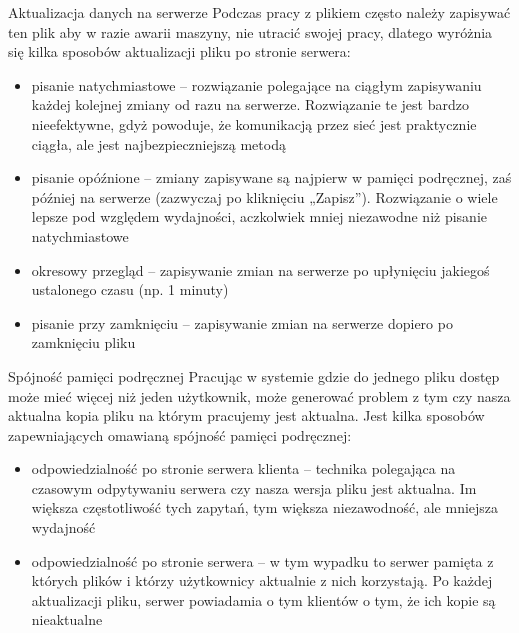 Aktualizacja danych na serwerze
Podczas pracy z plikiem często należy zapisywać ten plik aby w razie awarii maszyny, nie utracić swojej pracy, dlatego wyróżnia się kilka sposobów aktualizacji pliku po stronie serwera:
\begin{itemize}
\item pisanie natychmiastowe – rozwiązanie polegające na ciągłym zapisywaniu każdej kolejnej zmiany od razu na serwerze. Rozwiązanie te jest bardzo nieefektywne, gdyż powoduje, że komunikacją przez sieć jest praktycznie ciągła, ale jest najbezpieczniejszą metodą
\item pisanie opóźnione – zmiany zapisywane są najpierw w pamięci podręcznej, zaś później na serwerze (zazwyczaj po kliknięciu „Zapisz”). Rozwiązanie o wiele lepsze pod względem wydajności, aczkolwiek mniej niezawodne niż pisanie natychmiastowe
\item okresowy przegląd – zapisywanie zmian na serwerze po upłynięciu jakiegoś ustalonego czasu (np. 1 minuty)
\item pisanie przy zamknięciu – zapisywanie zmian na serwerze dopiero po zamknięciu pliku
 \end{itemize}
Spójność pamięci podręcznej
Pracując w systemie gdzie do jednego pliku dostęp może mieć więcej niż jeden użytkownik, może generować problem z tym czy nasza aktualna kopia pliku na którym pracujemy jest aktualna. Jest kilka sposobów zapewniających omawianą spójność pamięci podręcznej:
\begin{itemize}
\item odpowiedzialność po stronie serwera klienta – technika polegająca na czasowym odpytywaniu serwera czy nasza wersja pliku jest aktualna. Im większa częstotliwość tych zapytań, tym większa niezawodność, ale mniejsza wydajność
\item odpowiedzialność po stronie serwera – w tym wypadku to serwer pamięta z których plików i którzy użytkownicy aktualnie z nich korzystają. Po każdej aktualizacji pliku, serwer powiadamia o tym klientów o tym, że ich kopie są nieaktualne
\end{itemize}
